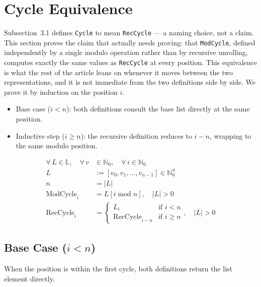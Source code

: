 \section{Cycle Equivalence}

Subsection~3.1 defines \texttt{Cycle} to mean \texttt{RecCycle} --- a naming
choice, not a claim. This section proves the claim that actually needs proving:
that \texttt{ModCycle}, defined independently by a single modulo operation
rather than by recursive unrolling, computes exactly the same values as
\texttt{RecCycle} at every position. This equivalence is what the rest of the
article leans on whenever it moves between the two representations, and it is
not immediate from the two definitions side by side. We prove it by induction
on the position $i$.

\begin{itemize}
  \item Base case ($i<n$): both definitions consult the base list directly at
    the same position.
  \item Inductive step ($i\geq n$): the recursive definition reduces to $i-n$,
    wrapping to the same modulo position.
\end{itemize}

\begin{equation*}
\begin{aligned}
\forall\, L\in\mathbb{L},\quad \forall\, v&\in\mathbb{N}_0,
  \quad \forall\, i\in\mathbb{N}_0 \\
L &:= [v_0,v_1,\dots,v_{n-1}]\in\mathbb{N}_0^n \\
n &= |L| \\
\operatorname{ModCycle}_i &= L[i\operatorname{mod}n],\quad |L|>0 \\
\operatorname{RecCycle}_i &=
\begin{cases}
L_i & \text{if } i<n \\
\operatorname{RecCycle}_{i-n} & \text{if } i\geq n
\end{cases},\quad |L|>0
\end{aligned}
\end{equation*}

\subsection{Base Case (\texorpdfstring{$i<n$}{i < n})}

When the position is within the first cycle, both definitions return the list
element directly.


